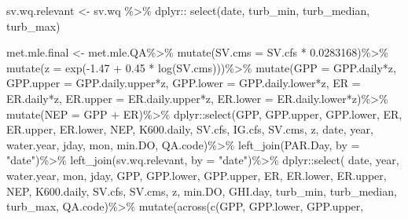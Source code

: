 \documentclass[
  letterpaper,
  DIV=11,
  numbers=noendperiod]{scrartcl}
\newenvironment{Shaded}{\begin{snugshade}}{\end{snugshade}}
\newcommand{\AttributeTok}[1]{\textcolor[rgb]{0.40,0.45,0.13}{#1}}
\newcommand{\FloatTok}[1]{\textcolor[rgb]{0.68,0.00,0.00}{#1}}
\newcommand{\FunctionTok}[1]{\textcolor[rgb]{0.28,0.35,0.67}{#1}}
\newcommand{\NormalTok}[1]{\textcolor[rgb]{0.00,0.23,0.31}{#1}}
\newcommand{\OtherTok}[1]{\textcolor[rgb]{0.00,0.23,0.31}{#1}}
\newcommand{\SpecialCharTok}[1]{\textcolor[rgb]{0.37,0.37,0.37}{#1}}
\newcommand{\StringTok}[1]{\textcolor[rgb]{0.13,0.47,0.30}{#1}}
\begin{document}
\begin{Shaded}
\begin{Highlighting}[]
\NormalTok{sv.wq.relevant }\OtherTok{\textless{}{-}}\NormalTok{ sv.wq }\SpecialCharTok{\%\textgreater{}\%}\NormalTok{ dplyr}\SpecialCharTok{::} \FunctionTok{select}\NormalTok{(date, turb\_min, turb\_median, turb\_max)}

\NormalTok{met.mle.final }\OtherTok{\textless{}{-}}\NormalTok{ met.mle.QA}\SpecialCharTok{\%\textgreater{}\%}
  \FunctionTok{mutate}\NormalTok{(}\AttributeTok{SV.cms =}\NormalTok{ SV.cfs }\SpecialCharTok{*} \FloatTok{0.0283168}\NormalTok{)}\SpecialCharTok{\%\textgreater{}\%}
  \FunctionTok{mutate}\NormalTok{(}\AttributeTok{z =} \FunctionTok{exp}\NormalTok{(}\SpecialCharTok{{-}}\FloatTok{1.47} \SpecialCharTok{+} \FloatTok{0.45} \SpecialCharTok{*} \FunctionTok{log}\NormalTok{(SV.cms)))}\SpecialCharTok{\%\textgreater{}\%}
  \FunctionTok{mutate}\NormalTok{(}\AttributeTok{GPP =}\NormalTok{ GPP.daily}\SpecialCharTok{*}\NormalTok{z,}
         \AttributeTok{GPP.upper =}\NormalTok{ GPP.daily.upper}\SpecialCharTok{*}\NormalTok{z,}
         \AttributeTok{GPP.lower =}\NormalTok{ GPP.daily.lower}\SpecialCharTok{*}\NormalTok{z,}
         \AttributeTok{ER =}\NormalTok{ ER.daily}\SpecialCharTok{*}\NormalTok{z,}
         \AttributeTok{ER.upper =}\NormalTok{ ER.daily.upper}\SpecialCharTok{*}\NormalTok{z,}
         \AttributeTok{ER.lower =}\NormalTok{ ER.daily.lower}\SpecialCharTok{*}\NormalTok{z)}\SpecialCharTok{\%\textgreater{}\%}
  \FunctionTok{mutate}\NormalTok{(}\AttributeTok{NEP =}\NormalTok{ GPP }\SpecialCharTok{+}\NormalTok{ ER)}\SpecialCharTok{\%\textgreater{}\%}
\NormalTok{ dplyr}\SpecialCharTok{::}\FunctionTok{select}\NormalTok{(GPP, GPP.upper, GPP.lower, ER, ER.upper, ER.lower, NEP, K600.daily, }
\NormalTok{         SV.cfs, IG.cfs, SV.cms, z, }
\NormalTok{         date, year, water.year, jday, mon,}
\NormalTok{         min.DO, QA.code)}\SpecialCharTok{\%\textgreater{}\%}
  \FunctionTok{left\_join}\NormalTok{(PAR.Day, }\AttributeTok{by =} \StringTok{"date"}\NormalTok{)}\SpecialCharTok{\%\textgreater{}\%}
  \FunctionTok{left\_join}\NormalTok{(sv.wq.relevant, }\AttributeTok{by =} \StringTok{"date"}\NormalTok{)}\SpecialCharTok{\%\textgreater{}\%}
\NormalTok{  dplyr}\SpecialCharTok{::}\FunctionTok{select}\NormalTok{(}
\NormalTok{    date, year, water.year, mon, jday,}
\NormalTok{    GPP, GPP.lower, GPP.upper, ER, ER.lower, ER.upper, NEP, K600.daily,}
\NormalTok{  SV.cfs, SV.cms, z, min.DO, GHI.day, turb\_min, turb\_median, turb\_max, QA.code)}\SpecialCharTok{\%\textgreater{}\%}
 \FunctionTok{mutate}\NormalTok{(}\FunctionTok{across}\NormalTok{(}\FunctionTok{c}\NormalTok{(GPP, GPP.lower, GPP.upper,}

\end{Highlighting}
\end{Shaded}
\end{document}
